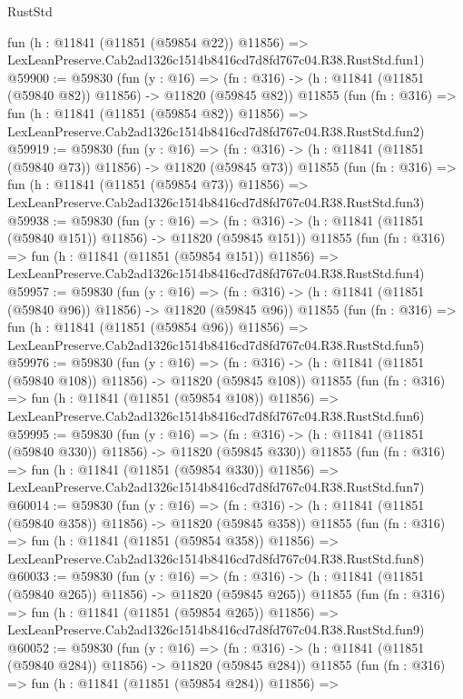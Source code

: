 \begin{lexlean}{RustStd}
\begin{coremodule}
    fun (h : @11841 (@11851 (@59854 @22)) @11856) =>
    LexLeanPreserve.Cab2ad1326c1514b8416cd7d8fd767c04.R38.RustStd.fun1)
@59900 := @59830
    (fun (y : @16) =>
    (fn : @316) -> (h : @11841 (@11851 (@59840 @82)) @11856) -> @11820 (@59845 @82))
    @11855
    (fun (fn : @316) =>
    fun (h : @11841 (@11851 (@59854 @82)) @11856) =>
    LexLeanPreserve.Cab2ad1326c1514b8416cd7d8fd767c04.R38.RustStd.fun2)
@59919 := @59830
    (fun (y : @16) =>
    (fn : @316) -> (h : @11841 (@11851 (@59840 @73)) @11856) -> @11820 (@59845 @73))
    @11855
    (fun (fn : @316) =>
    fun (h : @11841 (@11851 (@59854 @73)) @11856) =>
    LexLeanPreserve.Cab2ad1326c1514b8416cd7d8fd767c04.R38.RustStd.fun3)
@59938 := @59830
    (fun (y : @16) =>
    (fn : @316) -> (h : @11841 (@11851 (@59840 @151)) @11856) -> @11820 (@59845 @151))
    @11855
    (fun (fn : @316) =>
    fun (h : @11841 (@11851 (@59854 @151)) @11856) =>
    LexLeanPreserve.Cab2ad1326c1514b8416cd7d8fd767c04.R38.RustStd.fun4)
@59957 := @59830
    (fun (y : @16) =>
    (fn : @316) -> (h : @11841 (@11851 (@59840 @96)) @11856) -> @11820 (@59845 @96))
    @11855
    (fun (fn : @316) =>
    fun (h : @11841 (@11851 (@59854 @96)) @11856) =>
    LexLeanPreserve.Cab2ad1326c1514b8416cd7d8fd767c04.R38.RustStd.fun5)
@59976 := @59830
    (fun (y : @16) =>
    (fn : @316) -> (h : @11841 (@11851 (@59840 @108)) @11856) -> @11820 (@59845 @108))
    @11855
    (fun (fn : @316) =>
    fun (h : @11841 (@11851 (@59854 @108)) @11856) =>
    LexLeanPreserve.Cab2ad1326c1514b8416cd7d8fd767c04.R38.RustStd.fun6)
@59995 := @59830
    (fun (y : @16) =>
    (fn : @316) -> (h : @11841 (@11851 (@59840 @330)) @11856) -> @11820 (@59845 @330))
    @11855
    (fun (fn : @316) =>
    fun (h : @11841 (@11851 (@59854 @330)) @11856) =>
    LexLeanPreserve.Cab2ad1326c1514b8416cd7d8fd767c04.R38.RustStd.fun7)
@60014 := @59830
    (fun (y : @16) =>
    (fn : @316) -> (h : @11841 (@11851 (@59840 @358)) @11856) -> @11820 (@59845 @358))
    @11855
    (fun (fn : @316) =>
    fun (h : @11841 (@11851 (@59854 @358)) @11856) =>
    LexLeanPreserve.Cab2ad1326c1514b8416cd7d8fd767c04.R38.RustStd.fun8)
@60033 := @59830
    (fun (y : @16) =>
    (fn : @316) -> (h : @11841 (@11851 (@59840 @265)) @11856) -> @11820 (@59845 @265))
    @11855
    (fun (fn : @316) =>
    fun (h : @11841 (@11851 (@59854 @265)) @11856) =>
    LexLeanPreserve.Cab2ad1326c1514b8416cd7d8fd767c04.R38.RustStd.fun9)
@60052 := @59830
    (fun (y : @16) =>
    (fn : @316) -> (h : @11841 (@11851 (@59840 @284)) @11856) -> @11820 (@59845 @284))
    @11855
    (fun (fn : @316) =>
    fun (h : @11841 (@11851 (@59854 @284)) @11856) =>

\end{coremodule}
\end{lexlean}
